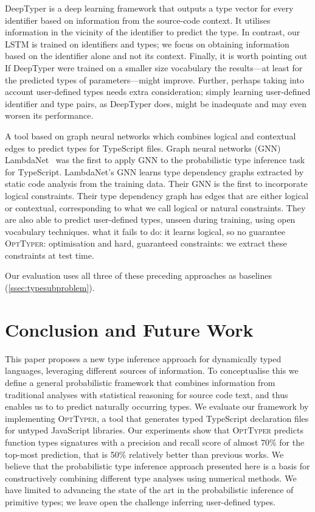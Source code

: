 \documentclass[acmsmall, review, anonymous]{acmart}\settopmatter{printfolios=true,printccs=false,printacmref=false}
\newcommand{\projectname}{\textsc{OptTyper}\xspace}
\newcommand{\margincomment}[2]{\marginpar{\scriptsize\color{Maroon}#1 says: #2}}
\newcommand{\ivp}[1]{\margincomment{IVP}{#1}}
\begin{document}
DeepTyper is a deep learning framework that outputs a type vector for every identifier
based on information from the source-code context.
It utilises information in the vicinity of the identifier to predict the type.
In contrast, our LSTM is trained on identifiers and types;
we focus on obtaining information based on the identifier alone and not its context.
Finally, it is worth pointing out 
If DeepTyper were trained on a smaller size vocabulary the results---at least for the predicted
types of parameters---might improve.
Further, perhaps taking into account user-defined types needs extra consideration;
simply learning user-defined identifier and type pairs, as DeepTyper does, might
be inadequate and may even worsen its performance.


A tool based on graph neural networks which combines logical and contextual edges
	 to predict types for TypeScript files.
Graph neural networks (GNN)~\citep{allamanis17a} \ivp{general def}
LambdaNet~\citet{wei20} was the first to apply GNN to the probabilistic type inference task for TypeScript.
LambdaNet's GNN learns type dependency graphs extracted by static 
code analysis from the training data.
Their GNN is the first to incorporate logical constraints.
 Their type dependency graph has edges that are either logical or contextual, corresponding to what we call logical or natural constraints.
They are also able to predict user-defined types, unseen during training, using open vocabulary techniques.
what it fails to do:  it learns logical, so no guarantee 
\projectname:  optimisation and hard, guaranteed constraints:  we extract these constraints at test time.

Our evaluation uses all three of these preceding approaches as baselines (\autoref{ssec:typesubproblem}).



\section{Conclusion and Future Work}\label{sec:conclusion}
This paper proposes a new type inference approach for
dynamically typed languages, leveraging different sources
of information.
%
To conceptualise this we define a
general probabilistic framework that combines
information from traditional analyses with statistical reasoning
for source code text, and thus enables us to to predict naturally occurring
types.
%
We evaluate our framework by implementing \projectname{}, a tool that
generates typed TypeScript declaration files for untyped JavaScript
libraries.
%
Our experiments show that \projectname{} predicts function types
signatures with a precision and recall score of almost 70\% for the top-most
prediction, that is 50\% relatively better than previous works.
We believe that the probabilistic type inference approach presented here
is a basis for constructively combining different type analyses using numerical methods.
%
We have limited to advancing the state of the art in the probabilistic inference
of primitive types; we leave open the challenge inferring user-defined types.
\end{document}
